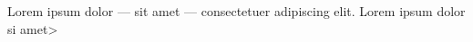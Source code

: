 \documentclass{minimal}
\begin{document}
Lorem ipsum dolor --- sit amet --- consectetuer adipiscing elit.
\<Lorem ipsum dolor si amet>
\end{document}
